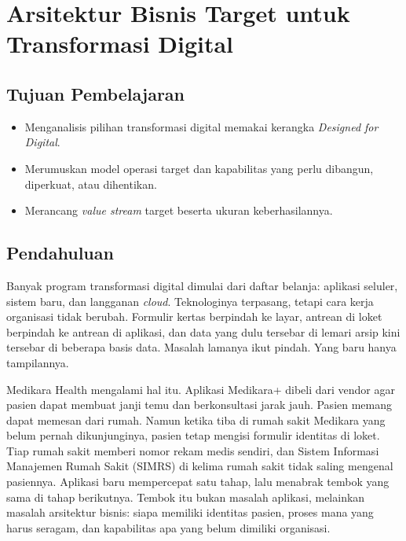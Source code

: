 \chapter{Arsitektur Bisnis Target untuk Transformasi Digital}
\label{ch:ch08-arsitektur-bisnis-target}

\section*{Tujuan Pembelajaran}
\begin{itemize}
  \item Menganalisis pilihan transformasi digital memakai kerangka \textit{Designed for Digital}.
  \item Merumuskan model operasi target dan kapabilitas yang perlu dibangun, diperkuat, atau
        dihentikan.
  \item Merancang \textit{value stream} target beserta ukuran keberhasilannya.
\end{itemize}

\section{Pendahuluan}

Banyak program transformasi digital dimulai dari daftar belanja: aplikasi seluler, sistem
baru, dan langganan \textit{cloud}. Teknologinya terpasang, tetapi cara kerja organisasi
tidak berubah. Formulir kertas berpindah ke layar, antrean di loket berpindah ke antrean di
aplikasi, dan data yang dulu tersebar di lemari arsip kini tersebar di beberapa basis data.
Masalah lamanya ikut pindah. Yang baru hanya tampilannya.

Medikara Health mengalami hal itu. Aplikasi Medikara+ dibeli dari vendor agar pasien dapat
membuat janji temu dan berkonsultasi jarak jauh. Pasien memang dapat memesan dari rumah.
Namun ketika tiba di rumah sakit Medikara yang belum pernah dikunjunginya, pasien tetap
mengisi formulir identitas di loket. Tiap rumah sakit memberi nomor rekam medis sendiri,
dan Sistem Informasi Manajemen Rumah Sakit (SIMRS) di kelima rumah sakit tidak saling
mengenal pasiennya. Aplikasi baru mempercepat satu tahap, lalu menabrak tembok yang sama di
tahap berikutnya. Tembok itu bukan masalah aplikasi, melainkan masalah arsitektur bisnis:
siapa memiliki identitas pasien, proses mana yang harus seragam, dan kapabilitas apa yang
belum dimiliki organisasi.

